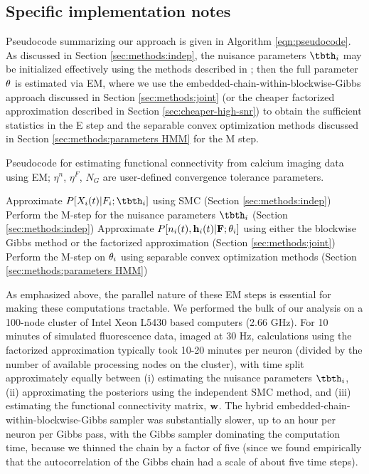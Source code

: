 \subsection{Specific implementation notes} \label{sec:methods:specific_implementation}

Pseudocode summarizing our approach is given in Algorithm \ref{eqn:pseudocode}. As discussed in Section \ref{sec:methods:indep}, the nuisance parameters $\tbth_i$ may be initialized effectively using the methods described in \cite{Vogelstein2009}; then the full parameter $\mathbf{\theta}$ is estimated via EM, where we use the embedded-chain-within-blockwise-Gibbs approach discussed in Section \ref{sec:methods:joint} (or the cheaper factorized approximation described in Section \ref{sec:cheaper-high-snr}) to obtain the sufficient statistics in the E step and the separable convex optimization methods discussed in Section \ref{sec:methods:parameters HMM} for the M step.

\begin{algorithm}[t!]
\caption{Pseudocode for estimating functional connectivity from
calcium imaging data using EM; $\eta^n$, $\eta^F$, $N_G$ are
user-defined convergence tolerance parameters.}
\label{eqn:pseudocode}
\begin{algorithmic}
      \State Approximate $P[X_i(t)|F_i; \tbth_i]$ using SMC (Section \ref{sec:methods:indep})
      \State Perform the M-step for the nuisance parameters $\tbth_i$ (Section \ref{sec:methods:indep})
    \EndWhile
  \EndFor
      \State Approximate $P[n_i(t), \mathbf{h}_i(t) |{\bf F}; \mathbf{\theta}_i]$ using either the blockwise Gibbs
      \State method or the factorized approximation (Section \ref{sec:methods:joint})
    \EndFor
  	\State Perform the M-step on $\mathbf{\theta}_i$ using separable convex optimization methods (Section \ref{sec:methods:parameters HMM})
  \EndFor
\EndWhile
\end{algorithmic}
\end{algorithm}

As emphasized above, the parallel nature of these EM steps is essential for making these computations tractable. We performed the bulk of our analysis on a 100-node cluster of Intel Xeon L5430 based computers (2.66 GHz). For 10 minutes of simulated fluorescence data, imaged at $30$ Hz, calculations using the factorized approximation typically took 10-20 minutes per neuron (divided by the number of available processing nodes on the cluster), with time split approximately equally between (i) estimating the nuisance parameters $\tbth_i $, (ii) approximating the posteriors using the independent SMC method, and (iii) estimating the functional connectivity matrix, $\mathbf{w}$. The hybrid embedded-chain-within-blockwise-Gibbs sampler was substantially slower, up to an hour per neuron per Gibbs pass, with the Gibbs sampler dominating the computation time, because we thinned the chain by a factor of five (since we found empirically that the autocorrelation of the Gibbs chain had a scale of about five time steps).

